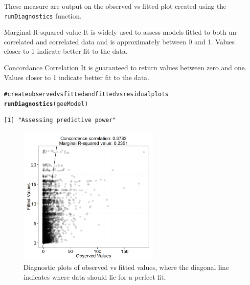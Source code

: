 \documentclass[11pt, a4paper]{article}
\makeatletter
\newcommand{\hlfunctioncall}[1]{\textcolor[rgb]{0.501960784313725,0,0.329411764705882}{\textbf{#1}}}%
\newcommand{\hlcomment}[1]{\textcolor[rgb]{0.180392156862745,0.6,0.341176470588235}{#1}}%
\newenvironment{kframe}{%
 \def\at@end@of@kframe{}%
 \ifinner\ifhmode%
  \def\at@end@of@kframe{\end{minipage}}%
  \begin{minipage}{\columnwidth}%
 \fi\fi%
 \def\FrameCommand##1{\hskip\@totalleftmargin \hskip-\fboxsep
 \colorbox{shadecolor}{##1}\hskip-\fboxsep
     \hskip-\linewidth \hskip-\@totalleftmargin \hskip\columnwidth}%
 \MakeFramed {\advance\hsize-\width
   \@totalleftmargin\z@ \linewidth\hsize
   \@setminipage}}%
 {\par\unskip\endMakeFramed%
 \at@end@of@kframe}
\newenvironment{knitrout}{}{} %
\makeatother
\begin{document}
\begin{frame}[fragile]
These measure are output on the observed vs fitted plot created using the {\tt runDiagnostics} function. 

\begin{block}{Marginal R-squared value}
It is widely used to assess models fitted to both un-correlated and correlated data and is approximately between 0 and 1.  Values closer to 1 indicate better fit to the data.
\end{block}

\begin{block}{Concordance Correlation}
It is guaranteed to return values between zero and one.  Values closer to 1 indicate better fit to the data.
\end{block}

\begin{knitrout}\footnotesize
{}\color{fgcolor}\begin{kframe}
\begin{alltt}
\hlcomment{# create observed vs fitted and fitted vs residual plots}
\hlfunctioncall{runDiagnostics}(geeModel)
\end{alltt}
\begin{verbatim}
[1] "Assessing predictive power"
\end{verbatim}
\end{kframe}
\end{knitrout}

\end{frame}

\begin{frame}[fragile]
\begin{figure}[h]
  \centering
    \includegraphics[width=7cm]{FitPlots_fitted.png}
  \caption{Diagnostic plots of observed vs fitted values, where the diagonal line indicates where data should lie for a perfect fit.}
  \label{fig:diagplots1}
\end{figure}
\end{frame}
\end{document}
